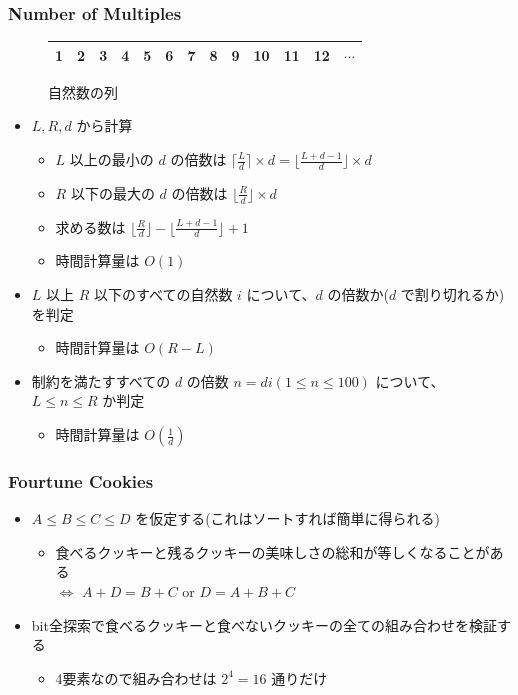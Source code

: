 \documentclass[t, aspectratio=169, dvipdfmx]{beamer}
\begin{document}
\begin{frame}
  \frametitle{Number of Multiples}
  \begin{figure}[b]
    \begin{tabular}{*{13}{|c}|}  & 2 & 3 & 4 & 5 & 6 & 7 & 8 & 9 & 10 & 11 & 12 & $\cdots$ \\ \hline
    \end{tabular}
    \caption{自然数の列}
  \end{figure}
  \begin{itemize}
    \item $L,R,d$ から計算
    \begin{itemize}
      \item $L$ 以上の最小の $d$ の倍数は $\lceil\frac{L}{d}\rceil \times d=\lfloor\frac{L+d-1}{d}\rfloor \times d$
      \item $R$ 以下の最大の $d$ の倍数は $\lfloor\frac{R}{d}\rfloor \times d$
      \item 求める数は $\lfloor\frac{R}{d}\rfloor - \lfloor\frac{L+d-1}{d}\rfloor + 1$
      \item 時間計算量は $O(1)$
    \end{itemize}
    \item $L$ 以上 $R$ 以下のすべての自然数 $i$ について、$d$ の倍数か($d$ で割り切れるか)を判定
    \begin{itemize}
      \item 時間計算量は $O(R-L)$
    \end{itemize}
    \item 制約を満たすすべての $d$ の倍数 $n=di(1 \leq n \leq 100)$ について、 $L \leq n \leq R$ か判定
    \begin{itemize}
      \item 時間計算量は $O(\frac{1}{d})$
    \end{itemize}
  \end{itemize}
\end{frame}

\begin{frame}[c]
\end{frame}

\begin{frame}
  \frametitle{Fourtune Cookies}
  \begin{itemize}
    \item $A \leq B \leq C \leq D$ を仮定する(これはソートすれば簡単に得られる)
    \begin{itemize}
      \item 食べるクッキーと残るクッキーの美味しさの総和が等しくなることがある \\
      $\iff$ $A+D=B+C$ or $D=A+B+C$
    \end{itemize}
    \item bit全探索で食べるクッキーと食べないクッキーの全ての組み合わせを検証する
    \begin{itemize}
      \item 4要素なので組み合わせは $2^4=16$ 通りだけ
    \end{itemize}
  \end{itemize}
\end{frame}
\end{document}
